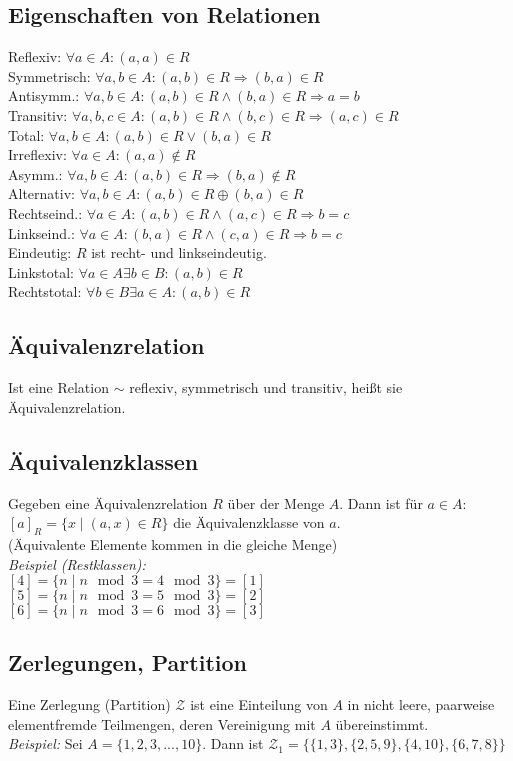 \subsection*{Eigenschaften von Relationen}
Reflexiv: $\forall a\in A:(a,a)\in R$\\
Symmetrisch: $\forall a,b\in A:(a,b)\in R\Rightarrow (b,a)\in R$\\
Antisymm.: $\forall a,b\in A:(a,b)\in R\wedge (b,a)\in R\Rightarrow a=b$\\
Transitiv: $\forall a,b,c\in A:(a,b)\in R\wedge (b,c)\in R\Rightarrow (a,c)\in R$\\
Total: $\forall a,b \in A: (a,b)\in R\vee (b,a)\in R$\\
Irreflexiv: $\forall a\in A: (a,a)\notin R$\\
Asymm.: $\forall a,b\in A:(a,b)\in R\Rightarrow (b,a)\notin R$\\
Alternativ: $\forall a,b\in A:(a,b)\in R\oplus (b,a)\in R$\\
Rechtseind.: $\forall a\in A:(a,b)\in R\wedge (a,c)\in R\Rightarrow b=c$\\
Linkseind.: $\forall a\in A:(b,a)\in R\wedge (c,a)\in R\Rightarrow b=c$\\
Eindeutig: $R$ ist recht- und linkseindeutig.\\
Linkstotal: $\forall a\in A\exists b\in B:(a,b)\in R$\\
Rechtstotal: $\forall b\in B\exists a\in A:(a,b)\in R$
\subsection*{Äquivalenzrelation}
Ist eine Relation $\sim$ reflexiv, symmetrisch und transitiv, heißt sie Äquivalenzrelation.
\subsection*{Äquivalenzklassen}
Gegeben eine Äquivalenzrelation $R$ über der Menge $A$.
Dann ist für $a\in A$: $[a]_R=\{x\mid (a,x)\in R\}$ die Äquivalenzklasse von $a$.\\
(Äquivalente Elemente kommen in die gleiche Menge)\\
\emph{Beispiel (Restklassen):}\\
$[4]=\{n\mid n\mod 3=4 \mod 3\}=[1]$\\
$[5]=\{n\mid n\mod 3=5 \mod 3\}=[2]$\\
$[6]=\{n\mid n\mod 3=6 \mod 3\}=[3]$
\subsection*{Zerlegungen, Partition}
Eine Zerlegung (Partition) $\mathcal{Z}$ ist eine Einteilung von $A$ in nicht leere, paarweise
elementfremde Teilmengen, deren Vereinigung mit $A$ übereinstimmt.\\
\emph{Beispiel:} Sei $A=\{1,2,3,...,10\}$. Dann ist $\mathcal{Z_1}=\{\{1,3\},\{2,5,9\},\{4,10\},\{6,7,8\}\}$

